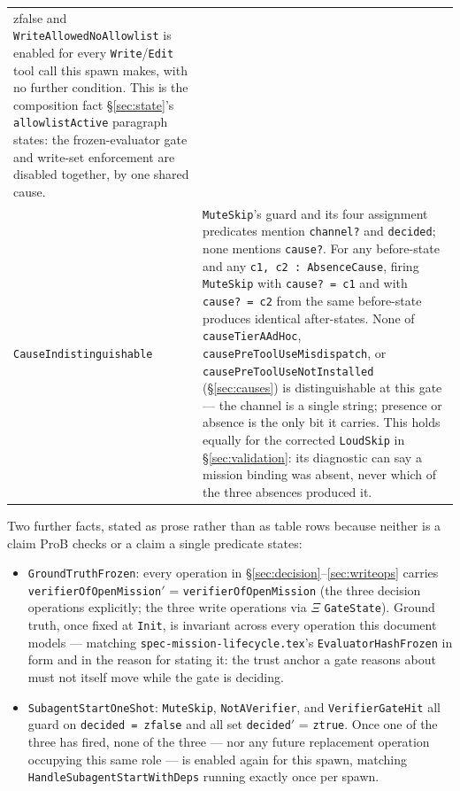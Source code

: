 \documentclass[a4paper,10pt,fleqn]{article}
\newcommand{\fpath}[1]{\texttt{#1}}
\newcommand{\field}[1]{\texttt{#1}}
\begin{document}
\begin{center}
\begin{tabularx}{\textwidth}{@{}lX@{}}
{  zfalse} and \field{WriteAllowedNoAllowlist} is enabled for every
  \field{Write}/\field{Edit} tool call this spawn makes, with no
  further condition. This is the composition fact
  \S\ref{sec:state}'s \field{allowlistActive} paragraph states: the
  frozen-evaluator gate and write-set enforcement are disabled
  together, by one shared cause. \\
\field{CauseIndistinguishable} &
  \field{MuteSkip}'s guard and its four assignment predicates
  mention \field{channel?} and \field{decided}; none mentions
  \field{cause?}. For any before-state and any \field{c1, c2 :
  AbsenceCause}, firing \field{MuteSkip} with \field{cause? = c1}
  and with \field{cause? = c2} from the same before-state produces
  identical after-states. None of \field{causeTierAAdHoc},
  \field{causePreToolUseMisdispatch}, or
  \field{causePreToolUseNotInstalled} (\S\ref{sec:causes}) is
  distinguishable at this gate --- the channel is a single string;
  presence or absence is the only bit it carries. This holds equally
  for the corrected \field{LoudSkip} in \S\ref{sec:validation}: its
  diagnostic can say a mission binding was absent, never which of the
  three absences produced it. \\
\bottomrule
\end{tabularx}
\end{center}

Two further facts, stated as prose rather than as table rows because
neither is a claim ProB checks or a claim a single predicate states:

\begin{itemize}
  \item \field{GroundTruthFrozen}: every operation in
    \S\ref{sec:decision}--\ref{sec:writeops} carries
    \field{verifierOfOpenMission}$'$ = \field{verifierOfOpenMission}
    (the three decision operations explicitly; the three write
    operations via $\Xi$ \field{GateState}). Ground truth, once fixed
    at \field{Init}, is invariant across every operation this
    document models --- matching \fpath{spec-mission-lifecycle.tex}'s
    \field{EvaluatorHashFrozen} in form and in the reason for stating
    it: the trust anchor a gate reasons about must not itself move
    while the gate is deciding.
  \item \field{SubagentStartOneShot}: \field{MuteSkip},
    \field{NotAVerifier}, and \field{VerifierGateHit} all guard on
    \field{decided = zfalse} and all set \field{decided}$'$ =
    \field{ztrue}. Once one of the three has fired, none of the three
    --- nor any future replacement operation occupying this same
    role --- is enabled again for this spawn, matching
    \field{HandleSubagentStartWithDeps} running exactly once per
    spawn.
\end{itemize}
\end{document}
